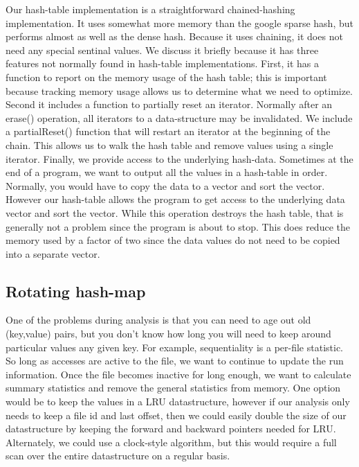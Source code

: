 Our hash-table implementation is a straightforward chained-hashing
implementation.  It uses somewhat more memory than the google sparse
hash, but performs almost as well as the dense hash.  Because it uses
chaining, it does not need any special sentinal values.  We discuss it
briefly because it has three features not normally found in hash-table
implementations.  First, it has a function to report on the memory
usage of the hash table; this is important because tracking memory
usage allows us to determine what we need to optimize.  Second it
includes a function to partially reset an iterator.  Normally after an
erase() operation, all iterators to a data-structure may be
invalidated.  We include a partialReset() function that will restart
an iterator at the beginning of the chain.  This allows us to walk the
hash table and remove values using a single iterator.  Finally, we
provide access to the underlying hash-data.  Sometimes at the end of a
program, we want to output all the values in a hash-table in order.
Normally, you would have to copy the data to a vector and sort the
vector.  However our hash-table allows the program to get access to
the underlying data vector and sort the vector.  While this operation
destroys the hash table, that is generally not a problem since the
program is about to stop.  This does reduce the memory used by a
factor of two since the data values do not need to be copied into a
separate vector.

\subsection{Rotating hash-map}

One of the problems during analysis is that you can need to age out
old (key,value) pairs, but you don't know how long you will need to
keep around particular values any given key.  For example,
sequentiality is a per-file statistic.  So long as accesses are active
to the file, we want to continue to update the run information.  Once
the file becomes inactive for long enough, we want to calculate
summary statistics and remove the general statistics from memory.  One
option would be to keep the values in a LRU datastructure, however if
our analysis only needs to keep a file id and last offset, then we
could easily double the size of our datastructure by keeping the
forward and backward pointers needed for LRU.  Alternately, we could
use a clock-style algorithm, but this would require a full scan over
the entire datastructure on a regular basis.

